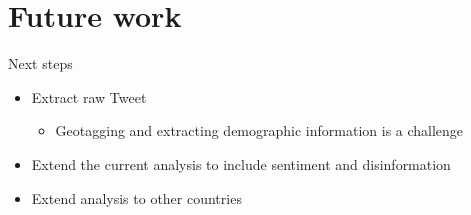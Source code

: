 \documentclass{beamer}
\begin{document}
\section{Future work}
\begin{frame}{Next steps}
  \begin{itemize}
    \item Extract raw Tweet
    \begin{itemize}
    \item Geotagging and extracting demographic information is a challenge \\[10pt]
    \end{itemize}
  \item Extend the current analysis to include sentiment and disinformation \\[10pt] 
  \item Extend analysis to other countries
  \end{itemize}
\end{frame}
\end{document}
